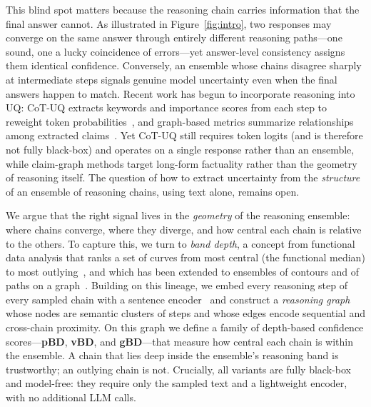 \documentclass[11pt]{article}
\begin{document}
This blind spot matters because the reasoning chain carries information that the
final answer cannot. As illustrated in Figure~\ref{fig:intro}, two responses may
converge on the same answer through entirely different reasoning paths---one
sound, one a lucky coincidence of errors---yet answer-level consistency assigns
them identical confidence.
Conversely, an ensemble whose chains disagree sharply at intermediate steps
signals genuine model uncertainty even when the final answers happen to match.
Recent work has begun to incorporate reasoning into UQ: CoT-UQ extracts
keywords and importance scores from each step to reweight token
probabilities~\citep{zhang2025cotuq}, and graph-based metrics summarize
relationships among extracted claims~\citep{jiang2024graphuncertainty}. Yet
CoT-UQ still requires token logits (and is therefore not fully black-box) and
operates on a single response rather than an ensemble, while claim-graph methods
target long-form factuality rather than the geometry of reasoning itself. The
question of how to extract uncertainty from the \emph{structure} of an ensemble
of reasoning chains, using text alone, remains open.

We argue that the right signal lives in the \emph{geometry} of the reasoning
ensemble: where chains converge, where they diverge, and how central each chain
is relative to the others. To capture this, we turn to \emph{band depth}, a
concept from functional data analysis that ranks a set of curves from most
central (the functional median) to most outlying~\citep{lopezpintado2009banddepth},
and which has been extended to ensembles of contours and of paths on a
graph~\citep{santer2023contourbanddepth, raj2017pathboxplots}. Building on this
lineage, we embed every reasoning step of every sampled chain with a sentence
encoder~\citep{reimers2019sentencebert} and construct a \emph{reasoning graph}
whose nodes are semantic clusters of steps and whose edges encode sequential and
cross-chain proximity. On this graph we define a family of depth-based
confidence scores---\textbf{pBD}, \textbf{vBD}, and \textbf{gBD}---that measure
how central each chain is within the ensemble. A chain that lies deep inside the
ensemble's reasoning band is trustworthy; an outlying chain is not. Crucially,
all variants are fully black-box and model-free: they require only the sampled
text and a lightweight encoder, with no additional LLM calls.
\end{document}
